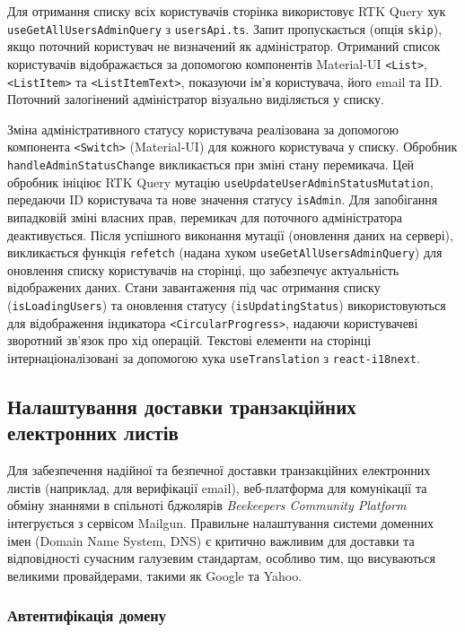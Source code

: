 Для отримання списку всіх користувачів сторінка використовує RTK Query хук \texttt{useGetAllUsersAdminQuery} з \texttt{usersApi.ts}. Запит пропускається (опція \texttt{skip}), якщо поточний користувач не визначений як адміністратор. Отриманий список користувачів відображається за допомогою компонентів Material-UI \texttt{<List>}, \texttt{<ListItem>} та \texttt{<ListItemText>}, показуючи ім'я користувача, його email та ID. Поточний залогінений адміністратор візуально виділяється у списку.

Зміна адміністративного статусу користувача реалізована за допомогою компонента \texttt{<Switch>} (Material-UI) для кожного користувача у списку. Обробник \texttt{handleAdminStatusChange} викликається при зміні стану перемикача. Цей обробник ініціює RTK Query мутацію \texttt{useUpdateUserAdminStatusMutation}, передаючи ID користувача та нове значення статусу \texttt{isAdmin}. Для запобігання випадковій зміні власних прав, перемикач для поточного адміністратора деактивується. Після успішного виконання мутації (оновлення даних на сервері), викликається функція \texttt{refetch} (надана хуком \texttt{useGetAllUsersAdminQuery}) для оновлення списку користувачів на сторінці, що забезпечує актуальність відображених даних. Стани завантаження під час отримання списку (\texttt{isLoadingUsers}) та оновлення статусу (\texttt{isUpdatingStatus}) використовуються для відображення індикатора \texttt{<CircularProgress>}, надаючи користувачеві зворотний зв'язок про хід операцій. Текстові елементи на сторінці інтернаціоналізовані за допомогою хука \texttt{useTranslation} з \texttt{react-i18next}.

\subsection{Налаштування доставки транзакційних електронних листів}
\label{subsec:email_delivery}

Для забезпечення надійної та безпечної доставки транзакційних електронних листів (наприклад, для верифікації email), веб-платформа для комунікації та обміну знаннями в спільноті бджолярів \textit{Beekeepers Community Platform} інтегрується з сервісом Mailgun. Правильне налаштування системи доменних імен (Domain Name System, DNS) є критично важливим для доставки та відповідності сучасним галузевим стандартам, особливо тим, що висуваються великими провайдерами, такими як Google та Yahoo.

\subsubsection{Автентифікація домену}

